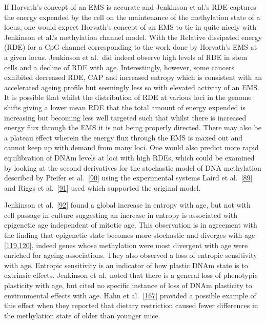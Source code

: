 \documentclass[
]{book}
\begin{document}
If Horvath's concept of an EMS is accurate and Jenkinson et al.'s RDE captures the energy expended by the cell on the maintenance of the methylation state of a locus, one would expect Horvath's concept of an EMS to tie in quite nicely with Jenkinson et al.'s methylation channel model.
With the Relative dissipated energy (RDE) for a CpG channel corresponding to the work done by Horvath's EMS at a given locus.
Jenkinson et al.~did indeed observe high levels of RDE in stem cells and a decline of RDE with age.
Interestingly, however, some cancers exhibited decreased RDE, CAP and increased entropy which is consistent with an accelerated ageing profile but seemingly less so with elevated activity of an EMS.
It is possible that whilst the distribution of RDE at various loci in the genome shifts giving a lower mean RDE that the total amount of energy expended is increasing but becoming less well targeted such that whilst there is increased energy flux through the EMS it is not being properly directed.
There may also be a plateau effect wherein the energy flux through the EMS is maxed out and cannot keep up with demand from many loci.
One would also predict more rapid equilibration of DNAm levels at loci with high RDEs, which could be examined by looking at the second derivatives for the stochastic model of DNA methylation described by Pfeifer et al.~{[}\protect\hyperlink{ref-Pfeifer1990a}{90}{]} using the experimental systems Laird et al.~{[}\protect\hyperlink{ref-Laird2004}{89}{]} and Riggs et al.~{[}\protect\hyperlink{ref-Riggs2004a}{91}{]} used which supported the original model.

Jenkinson et al.~{[}\protect\hyperlink{ref-Jenkinson2017}{92}{]} found a global increase in entropy with age, but not with cell passage in culture suggesting an increase in entropy is associated with epigenetic age independent of mitotic age.
This observation is in agreement with the finding that epigenetic state becomes more stochastic and diverges with age {[}\protect\hyperlink{ref-Fraga2005}{119},\protect\hyperlink{ref-Slieker2016}{120}{]}, indeed genes whose methylation were most divergent with age were enriched for ageing associations.
They also observed a loss of entropic sensitivity with age.
Entropic sensitivity is an indicator of how plastic DNAm state is to extrinsic effects.
Jenkinson et al.~noted that there is a general loss of phenotypic plasticity with age, but cited no specific instance of loss of DNAm plasticity to environmental effects with age.
Hahn et al.~{[}\protect\hyperlink{ref-Hahn2017}{167}{]} provided a possible example of this effect when they reported that dietary restriction caused fewer differences in the methylation state of older than younger mice.
\end{document}
